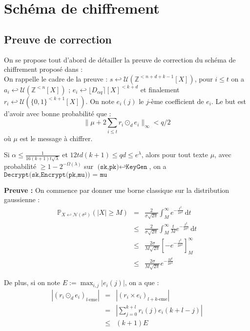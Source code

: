 \documentclass[11pt,a4paper]{article}
\begin{document}
\section{Schéma de chiffrement}

\subsection{Preuve de correction}
On se propose tout d'abord de détailler la preuve de correction du schéma de chiffrement proposé dans \cite{mplwe} : \\

On rappelle le cadre de la preuve : $s \hookleftarrow \mathcal{U}(\mathbb{Z}^{<n+d+k-1}[X])$, pour $i\leq t$ on a $a_i \hookleftarrow \mathcal{U}(\mathbb{Z}^{<n}[X])$ ; $e_i \hookleftarrow \lfloor D_{\alpha q}\rceil[X]^{<k+d}$ et finalement $r_i \hookleftarrow \mathcal{U}(\{0,1\}^{<k+1}[X])$. On note $e_i(j)$ le $j$-ème coefficient de $e_i$. Le but est d'avoir avec bonne probabilité que : 
\[\|\mu + 2\sum_{i \leq t}r_i \odot_d e_i  \|_\infty < q/2 \] où $\mu$ est le message à chiffrer. 
\begin{theorem}
Si $\alpha \leq \frac{1}{16(k+1)t\sqrt{\lambda}}$ et  $12td(k+1)\leq qd\leq e^\lambda$, alors pour tout texte $\mu$, avec probabilité $\geq 1 - 2^{-\Omega(\lambda)}$ sur $\texttt{(sk,pk)}\hookleftarrow\texttt{KeyGen} $, on a $\texttt{Decrypt(sk,Encrypt(pk,mu)) = mu}$ 
\end{theorem}
\textbf{Preuve :}
On commence par donner une borne classique sur la distribution gaussienne : 
\begin{eqnarray*}
\mathbb{P}_{X \hookleftarrow \mathcal{N}(\sigma^2)}(|X| \geq M) &=& \frac{2}{\sigma \sqrt{2 \pi}} \int_{M}^\infty e^{-\frac{t^2}{2 \sigma^2}} \, \mathrm{d}t \\
&\leq &  \frac{2}{\sigma \sqrt{2 \pi}}\int_{M}^\infty \frac{t}{M} e^{-\frac{t^2}{2 \sigma^2}} \, \mathrm{d}t \\
& \leq & \frac{2\sigma}{M \sqrt{2 \pi}} [-e^{-\frac{t^2}{2 \sigma^2}}]_M^\infty \\
& \leq & \frac{2\sigma}{M \sqrt{2 \pi}} e^{-\frac{M^2}{2 \sigma^2}}
\end{eqnarray*}


De plus, si on note $E := \max_{i,j} |e_i(j)|$, on a que :  \\
\begin{eqnarray*}
|(r_i \odot_d e_i)_{l\text{-eme}}| &=& |(r_i\times e_i)_{l+k\text{-eme}}| \\
&=& |\sum_{j=0}^{k+l}r_i(j)e_i(k+l-j)| \\
&\leq& (k+1)E
\end{eqnarray*}
\end{document}

